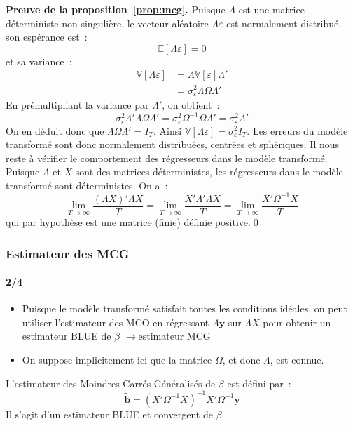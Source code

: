 \documentclass[10pt]{beamer}
\begin{document}
\begin{notes}

  \textbf{Preuve de la proposition~\ref{prop:mcg}.} Puisque $\Lambda$ est une matrice déterministe non singulière, le vecteur aléatoire $\Lambda\varepsilon$ est normalement distribué, son espérance est~:
  \[
    \mathbb E [\Lambda\varepsilon] = 0
  \]
  et sa variance~:
  \[
    \begin{split}
      \mathbb V[\Lambda\varepsilon] &= \Lambda \mathbb V[\varepsilon] \Lambda'\\
      &= \sigma_{\varepsilon}^2 \Lambda \Omega \Lambda'
    \end{split}
  \]
  En prémultipliant la variance par $\Lambda'$, on obtient~:
  \[
    \sigma_{\varepsilon}^2\Lambda'\Lambda \Omega\Lambda' = \sigma_{\varepsilon}^2\Omega^{-1}\Omega \Lambda' = \sigma_{\varepsilon}^2\Lambda'
  \]
  On en déduit donc que $\Lambda \Omega \Lambda' = I_T$. Ainsi $\mathbb V [\Lambda\varepsilon] = \sigma_{\varepsilon}^2I_T$. Les erreurs du modèle transformé sont donc normalement distribuées, centrées et sphériques. Il nous reste à vérifier le comportement des régresseurs dans le modèle transformé. Puisque $\Lambda$ et $X$ sont des matrices déterministes, les régresseurs dans le modèle transformé sont déterministes. On a~:
  \[
    \lim_{T\rightarrow\infty}\frac{(\Lambda X)'\Lambda X}{T} = \lim_{T\rightarrow\infty}\frac{X'\Lambda'\Lambda X}{T} = \lim_{T\rightarrow\infty}\frac{X'\Omega^{-1} X}{T}
  \]
  qui par hypothèse est une matrice (finie) définie positive.\qed
\end{notes}


\begin{frame}
  \frametitle{Estimateur des MCG}
  \framesubtitle{2/4}

  \begin{itemize}

  \item Puisque le modèle transformé satisfait toutes les conditions idéales, on peut utiliser l'estimateur des MCO en régressant $\Lambda \mathbf y$ sur $\Lambda X$ pour obtenir un estimateur BLUE de $\beta$ $\rightarrow$estimateur MCG\newline

  \item On suppose implicitement ici que la matrice $\Omega$, et donc $\Lambda$, est connue.\newline

  \end{itemize}


  \begin{prop}\label{prop:mcg:def}
    L'estimateur des Moindres Carrés Généralisés de $\beta$ est défini par~:
    \[
      \tilde{\mathbf b} = (X'\Omega^{-1}X)^{-1}X'\Omega^{-1}\mathbf y
    \]
    Il s'agit d'un estimateur BLUE et convergent de $\beta$.
  \end{prop}


\end{frame}
\end{document}
